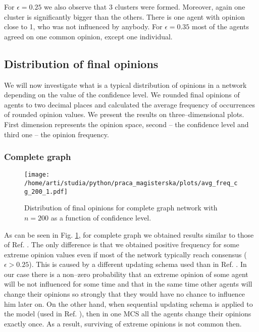 \documentclass[a4paper, 12pt]{article}
\begin{document}
For $\epsilon=0.25$ we also observe that 3 clusters were formed. Moreover, again one cluster is significantly bigger than the others. There is one agent with opinion close to 1, who was not influenced by anybody. For $\epsilon=0.35$ most of the agents agreed on one common opinion, except one individual.


\subsection{Distribution of final opinions}

We will now investigate what is a typical distribution of opinions in a network depending on the value of the confidence level. We rounded final opinions of agents to two decimal places and calculated the average frequency of occurrences of rounded opinion values. We present the results on three--dimensional plots. First dimension represents the opinion space, second -- the confidence level and third one -- the opinion frequency.

\subsubsection{Complete graph}

\begin{figure}[H]
		\centering
		\texttt{[image: /home/arti/studia/python/praca\_magisterska/plots/avg\_freq\_cg\_200\_1.pdf]}
		\caption{Distribution of final opinions for complete graph network with $n=200$ as a function of confidence level.}
		\label{f5}
\end{figure}

As can be seen in Fig. \ref{f5}, for complete graph we obtained results similar to those of Ref. \cite{bc}. The only difference is that we obtained positive frequency for some extreme opinion values even if most of the network typically reach consensus ($\epsilon > 0.25$). This is caused by a different updating schema used than in Ref. \cite{bc}. In our case there is a non--zero probability that an extreme opinion of some agent will be not influenced for some time and that in the same time other agents will change their opinions so strongly that they would have no chance to influence him later on. On the other hand, when sequential updating schema is applied to the model (used in Ref. \cite{bc}), then in one MCS all the agents change their opinions exactly once. As a result, surviving of extreme opinions is not common then.
\indent
\end{document}

